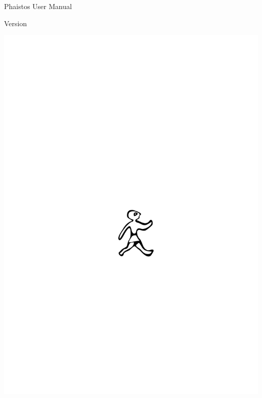 \documentclass[11pt,a4paper,twoside]{book}
\begin{document}
\newcommand{\notification}[1]{
\noindent
\begin{minipage}{\textwidth}
  \definecolor{lightgray}{gray}{0.85} %
  \definecolor{darkgray}{gray}{0.25} %
  \centering %
  \vspace*{.5em} %
  \setlength\fboxrule{1.5pt} %
  \fcolorbox{darkgray}{lightgray}{\parbox{.9\textwidth}{#1}} %
  \setlength\fboxsep{0pt} %
  \vspace*{.5em} %
\end{minipage} %
}



\begin{titlepage}
  
  \begin{center}

    \vspace*{5em}
    
    \begin{Huge}
      Phaistos User Manual
    \end{Huge}
    
    \vspace*{1em}
    
    \begin{LARGE}
      Version \phaistosversion
    \end{LARGE}

    \vspace*{6em}

    \includegraphics[width=.5\textwidth]{phaistos_logo_noname.pdf}
    
    \vspace*{6em}
    
    \begin{Large}
      \phaistosauthors
    \end{Large}
    
  \end{center}
  
\end{titlepage}
\end{document}
